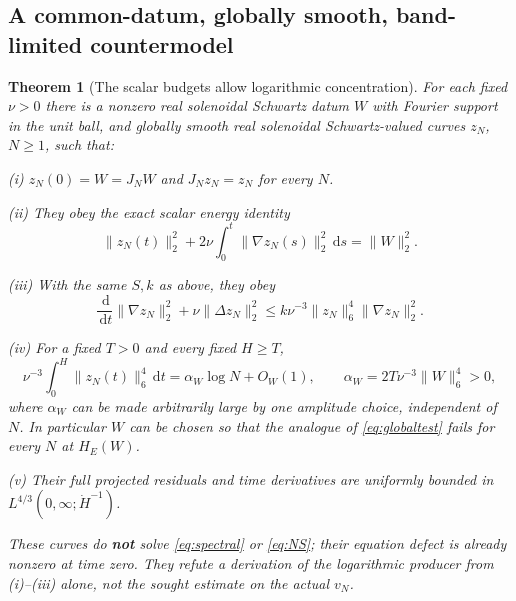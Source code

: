 \documentclass[11pt,a4paper]{article}
\newtheorem{theorem}{Theorem}[section]
\theoremstyle{definition}\newtheorem{definition}[theorem]{Definition}
\theoremstyle{remark}\newtheorem{remark}[theorem]{Remark}
\newcommand{\dd}{\,\mathrm d}
\newcommand{\norm}[1]{\lVert #1\rVert}
\numberwithin{equation}{section}
\begin{document}
\subsection{A common-datum, globally smooth, band-limited countermodel}
\begin{theorem}[The scalar budgets allow logarithmic concentration]\label{thm:capped}
For each fixed $\nu>0$ there is a nonzero real solenoidal Schwartz datum $W$ with Fourier support in the unit ball, and globally smooth real solenoidal Schwartz-valued curves $z_N$, $N\ge1$, such that:

\smallskip
\noindent (i) $z_N(0)=W=J_NW$ and $J_Nz_N=z_N$ for every $N$.

\smallskip
\noindent (ii) They obey the exact scalar energy identity
\begin{equation}\label{eq:cappedenergy}
 \norm{z_N(t)}_2^2+2\nu\int_0^t\norm{\nabla z_N(s)}_2^2\dd s=\norm W_2^2.
\end{equation}

\smallskip
\noindent (iii) With the same $S,k$ as above, they obey
\begin{equation}\label{eq:cappedens}
 \frac{\dd}{\dd t}\norm{\nabla z_N}_2^2+\nu\norm{\Delta z_N}_2^2
 \le k\nu^{-3}\norm{z_N}_6^4\norm{\nabla z_N}_2^2.
\end{equation}

\smallskip
\noindent (iv) For a fixed $T>0$ and every fixed $H\ge T$,
\begin{equation}\label{eq:cappedlog}
 \nu^{-3}\int_0^H\norm{z_N(t)}_6^4\dd t
 =\alpha_W\log N+O_W(1),\qquad
 \alpha_W=2T\nu^{-3}\norm W_6^4>0,
\end{equation}
where $\alpha_W$ can be made arbitrarily large by one amplitude choice, independent of $N$. In particular $W$ can be chosen so that the analogue of \eqref{eq:globaltest} fails for every $N$ at $H_E(W)$.

\smallskip
\noindent (v) Their full projected residuals and time derivatives are uniformly bounded in $L^{4/3}(0,\infty;\dot H^{-1})$.

These curves do \textbf{not} solve \eqref{eq:spectral} or \eqref{eq:NS}; their equation defect is already nonzero at time zero. They refute a derivation of the logarithmic producer from (i)--(iii) alone, not the sought estimate on the actual $v_N$.
\end{theorem}
\end{document}
